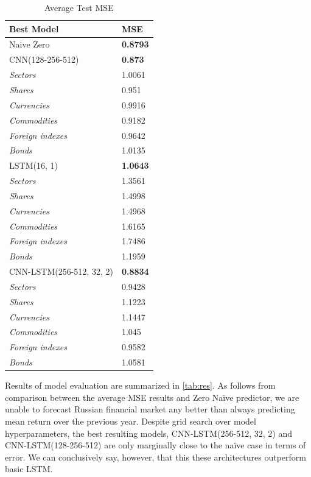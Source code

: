 \documentclass[review, authoryear]{elsarticle}
\begin{document}
\begin{table}
\centering
\caption{\label{tab:res}Average Test MSE}
\begin{tabularx}{0.5\textwidth}{l|X}
Best Model               & MSE            \\ \hline
Naive Zero               & \textbf{0.8793} \\ \hline
CNN(128-256-512)         & \textbf{0.873}  \\
\textit{Sectors}         & 1.0061          \\
\textit{Shares}          & 0.951           \\
\textit{Currencies}      & 0.9916          \\
\textit{Commodities}     & 0.9182          \\
\textit{Foreign indexes} & 0.9642          \\
\textit{Bonds}           & 1.0135          \\ \hline
LSTM(16, 1)              & \textbf{1.0643} \\
\textit{Sectors}         & 1.3561          \\
\textit{Shares}          & 1.4998          \\
\textit{Currencies}      & 1.4968          \\
\textit{Commodities}     & 1.6165          \\
\textit{Foreign indexes} & 1.7486          \\
\textit{Bonds}           & 1.1959          \\ \hline
CNN-LSTM(256-512, 32, 2) & \textbf{0.8834} \\
\textit{Sectors}         & 0.9428          \\
\textit{Shares}          & 1.1223          \\
\textit{Currencies}      & 1.1447          \\
\textit{Commodities}     & 1.045           \\
\textit{Foreign indexes} & 0.9582          \\
\textit{Bonds}           & 1.0581
\end{tabularx}
\end{table}

\noindent Results of model evaluation are summarized in \autoref{tab:res}. As follows from comparison between the average MSE results and Zero Naïve predictor, we are unable to forecast Russian financial market any better than always predicting mean return over the previous year. Despite grid search over model hyperparameters, the best resulting models, CNN-LSTM(256-512, 32, 2) and CNN-LSTM(128-256-512) are only marginally close to the naïve case in terms of error. We can conclusively say, however, that this these architectures outperform basic LSTM. 
\end{document}
